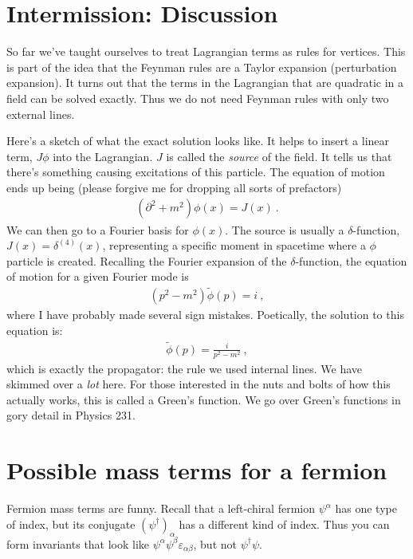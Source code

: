 \documentclass[12pt]{article}
\numberwithin{equation}{section}    %
\renewcommand{\tilde}{\widetilde}   %
\begin{document}
\section*{Intermission: Discussion}

So far we've taught ourselves to treat Lagrangian terms as rules for vertices. This is part of the idea that the Feynman rules are a Taylor expansion (perturbation expansion). It turns out that the terms in the Lagrangian that are quadratic in a field can be solved exactly. Thus we do not need Feynman rules with only two external lines. 

Here's a sketch of what the exact solution looks like. It helps to insert a linear term, $J\phi$ into the Lagrangian. $J$ is called the \emph{source} of the field. It tells us that there's something causing excitations of this particle. The equation of motion ends up being (please forgive me for dropping all sorts of prefactors)
\begin{align}
	\left(\partial^2 + m^2\right) \phi(x) = J(x) \ .
\end{align}
We can then go to a Fourier basis for $\phi(x)$. The source is usually a $\delta$-function, $J(x)=\delta^{(4)}(x)$, representing a specific moment in spacetime where a $\phi$ particle is created. Recalling the Fourier expansion of the $\delta$-function, the equation of motion for a given Fourier mode is
\begin{align}
	(p^2 - m^2) \tilde\phi(p) = i \ ,
\end{align}
where I have probably made several sign mistakes. Poetically, the solution to this equation is:
\begin{align}
	\tilde \phi(p) = \frac{i}{p^2 - m^2} \ ,
\end{align}
which is exactly the propagator: the rule we used internal lines. We have skimmed over a \emph{lot} here. For those interested in the nuts and bolts of how this actually works, this is called a Green's function. We go over Green's functions in gory detail in Physics 231. 

\section{Possible mass terms for a fermion}

Fermion mass terms are funny. Recall that a left-chiral fermion $\psi^\alpha$ has one type of index, but its conjugate $(\psi^\dag)_{\dot\alpha}$ has a different kind of index. Thus you can form invariants that look like $\psi^{\alpha}\psi^\beta\varepsilon_{\alpha\beta}$, but not $\psi^\dag \psi$.
\end{document}

